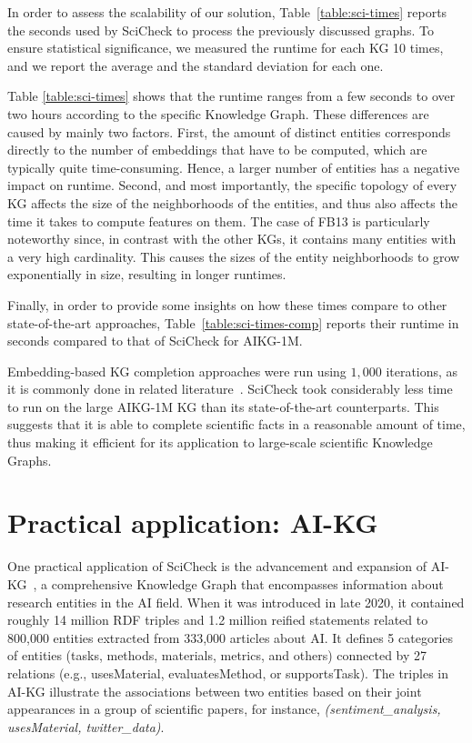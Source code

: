 In order to assess the scalability of our solution, Table~\ref{table:sci-times} reports the seconds used by SciCheck to process the previously discussed graphs. To ensure statistical significance, we measured the runtime for each KG 10 times, and we report the average and the standard deviation for each one. 



Table \ref{table:sci-times} shows that the runtime ranges from a few seconds to over two hours according to the specific Knowledge Graph. These differences are caused by mainly two factors. First, the amount of distinct entities corresponds directly to the number of \roberta{} embeddings that have to be computed, which are typically quite time-consuming. Hence, a larger number of entities has a negative impact on runtime. Second, and most importantly, the specific topology of every KG affects the size of the neighborhoods of the entities, and thus also affects the time it takes to compute features on them. The case of FB13 is particularly noteworthy since, in contrast with the other KGs, it contains many entities with a very high cardinality. This causes the sizes of the entity neighborhoods to grow exponentially in size, resulting in longer runtimes.

Finally, in order to provide some insights on how these times compare to other state-of-the-art approaches, Table~\ref{table:sci-times-comp} reports their runtime in seconds compared to that of SciCheck for AIKG-1M.



Embedding-based KG completion approaches were run using $1,000$ iterations, as it is commonly done in related literature~\cite{bordes2013, trouillon2016, kazemi2018, ji2015}. 
SciCheck took considerably less time to run on the large AIKG-1M KG than its state-of-the-art counterparts. This suggests that it is able to complete scientific facts in a reasonable amount of time, thus making it efficient for its application to large-scale scientific Knowledge Graphs.

\section{Practical application: AI-KG}\label{sec:sci-aikg}
One practical application of SciCheck is the advancement and expansion of AI-KG~\cite{dessi2020aikg}, a comprehensive Knowledge Graph that encompasses information about research entities in the AI field. When it was introduced in late 2020, it contained roughly 14 million RDF triples and 1.2 million reified statements related to 800,000 entities extracted from 333,000 articles about AI. It defines 5 categories of entities (tasks, methods, materials, metrics, and others) connected by 27 relations (e.g., usesMaterial, evaluatesMethod, or supportsTask). The triples in AI-KG illustrate the associations between two entities based on their joint appearances in a group of scientific papers, for instance, \textit{(sentiment\_analysis, usesMaterial, twitter\_data)}.

